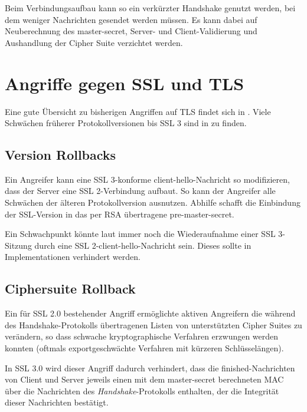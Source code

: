 \documentclass[
    12pt,
    headings=small,
    parskip=half,           %
    bibliography=totoc,
    numbers=noenddot,       %
    open=any,               %
   final                   %
    ]{scrreprt}
\newcommand{\mastersecret}		{master-secret}
\newcommand{\premastersecret}		{pre-master-secret}
\newcommand{\clienthello}			{client-hello}
\newcommand{\finished}				{finished}
\begin{document}
Beim Verbindungsaufbau kann so ein verkürzter Handshake genutzt werden, bei dem weniger Nachrichten gesendet werden müssen. Es kann dabei auf Neuberechnung des \mastersecret{}, Server- und Client-Validierung und Aushandlung der Cipher Suite verzichtet werden.




\chapter{Angriffe gegen SSL und TLS}

Eine gute Übersicht zu bisherigen Angriffen auf TLS findet sich in \cite{meyer13}. Viele Schwächen früherer Protokollversionen bis SSL 3 sind in \cite{wagner96} zu finden.

\section{Version Rollbacks}

Ein Angreifer kann eine SSL 3-konforme \clienthello{}-Nachricht so modifizieren, dass der Server eine SSL 2-Verbindung aufbaut. So kann der Angreifer alle Schwächen der älteren Protokollversion ausnutzen. Abhilfe schafft die Einbindung der SSL-Version in das per RSA übertragene \premastersecret. 

Ein Schwachpunkt könnte laut \cite{wagner96} immer noch die Wiederaufnahme einer SSL 3-Sitzung durch eine SSL 2-\clienthello{}-Nachricht sein. Dieses sollte in Implementationen verhindert werden.

\section{Ciphersuite Rollback}

Ein für SSL 2.0 bestehender Angriff ermöglichte aktiven Angreifern die während des Handshake-Protokolls übertragenen Listen von unterstützten Cipher Suites zu verändern, so dass schwache kryptographische Verfahren erzwungen werden konnten (oftmals exportgeschwächte Verfahren mit kürzeren Schlüsselängen).

In SSL 3.0 wird dieser Angriff dadurch verhindert, dass die \finished{}-Nachrichten von Client und Server jeweils einen mit dem \mastersecret{} berechneten MAC über die Nachrichten des \emph{Handshake}-Protokolls enthalten, der die Integrität dieser Nachrichten bestätigt.
\end{document}
